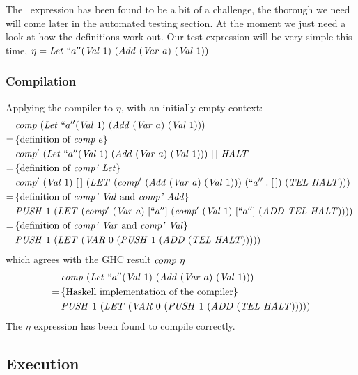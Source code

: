 \documentclass {article}
\begin{document}
The \leet\ expression has been found to be
a bit of a challenge, the thorough we need 
will come later in the automated testing section.
At the moment we just need a look at how the definitions
work out.
Our test expression will be very simple this time,
\( \eta = \mathit{Let\ } ``a'' (\mathit{Val\ } 1)\ (\mathit{Add\ } (\mathit{Var\ } a)\ (\mathit{Val\ } 1)) \) 

\subsubsection{Compilation}

Applying the compiler to $\eta$,
with an initially empty context:
\begin{align*}
&\Comp (\Let ``a'' (\Val 1)\ (\Add (\Var a)\ (\Val 1))) \\
=\, & \{ \mbox{definition of \comp\ $e$} \}\ \\ 
&\Compp  (\Let ``a'' (\Val 1)\ 
			(\Add (\Var a)\ (\Val 1)))\ [\, ]\ \HALT \\
=\, & \{ \mbox{definition of \compp\ \leet} \}\ \\
&\Compp  (\Val 1)\ [\, ]\ (\LET 
	(\Compp (\Add (\Var a)\ (\Val 1)))\ 
		(``a'':[\, ])\ (\TEL \HALT)))\ \\
=\, & \{ \mbox{definition of \compp\ \val\ and \compp\ \add} \}\ \\
&\PUSH 1\ (\LET 
	(\Compp (\Var a)\ [``a'']\ (\Compp (\Val 1)\ [``a'']\  
		(\ADD \TEL \HALT))))\ \\ 
=\, & \{ \mbox{definition of \compp\ \var\ and \compp\ \val} \}\ \\
&\PUSH 1\ (\LET 
	(\VAR 0\ (\PUSH 1\ 
		(\ADD (\TEL \HALT)))))\ \\ 
\end{align*}
which agrees with the GHC result \( \mathit{comp\ } \eta = \)
\begin{align*}
&\Comp (\Let ``a'' (\Val 1)\ (\Add (\Var a)\ (\Val 1)))\\
=\, & \{ \mbox{Haskell implementation of the compiler} \} \\
&\PUSH 1\ (\LET 
	(\VAR 0\ (\PUSH 1\ 
		(\ADD (\TEL \HALT)))))
\end{align*}
The $\eta$ expression has been found to compile
correctly.

\newcommand{\LETt}{\textit{LET}}
\subsection{Execution}
\end{document}
